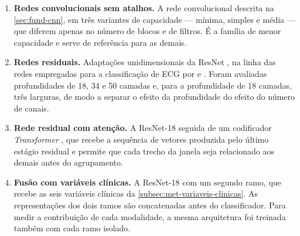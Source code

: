 \begin{enumerate}
	\item \textbf{Redes convolucionais sem atalhos.} A rede convolucional
	      descrita na \autoref{sec:fund-cnn}, em três variantes de capacidade ---
	      mínima, simples e média --- que diferem apenas no número de blocos e de
	      filtros. É a família de menor capacidade e serve de referência para as
	      demais.

	\item \textbf{Redes residuais.} Adaptações unidimensionais da ResNet
	      \cite{he2016deep}, na linha das redes empregadas para a classificação de
	      \gls{ECG} por  e
	      . Foram avaliadas profundidades de 18, 34
	      e 50 camadas e, para a profundidade de 18 camadas, três larguras, de modo a
	      separar o efeito da profundidade do efeito do número de canais.

	\item \textbf{Rede residual com atenção.} A ResNet-18 seguida de um
	      codificador \textit{Transformer} \cite{vaswani2017attention}, que recebe a
	      sequência de vetores produzida pelo último estágio residual e permite que
	      cada trecho da janela seja relacionado aos demais antes do agrupamento.

	\item \textbf{Fusão com variáveis clínicas.} A ResNet-18 com um segundo
	      ramo, que recebe as seis variáveis clínicas da
	      \autoref{subsec:met-variaveis-clinicas}. As representações dos dois ramos
	      são concatenadas antes do classificador. Para medir a contribuição de cada
	      modalidade, a mesma arquitetura foi treinada também com cada ramo isolado.
\end{enumerate}

